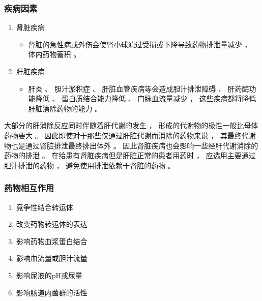 \documentclass[dvipsnames, svgnames, x11names]{beamer}
\begin{document}
\begin{frame}
    \frametitle{疾病因素}
    \begin{enumerate}
      \item 肾脏疾病
        \begin{itemize}
          \item 肾脏的急性病或外伤会使肾小球滤过受损或下降导致药物排泄量减少 ， 体内药物蓄积 。
        \end{itemize}
      \item 肝脏疾病
        \begin{itemize}
          \item 肝炎 、 胆汁淤积症 、 肝脏血管疾病等会造成胆汁排泄障碍 、 肝药酶功能降低 、 蛋白质结合能力降低 、 门脉血流量减少 ， 这些疾病都将降低肝脏清除药物的能力 。
        \end{itemize}
    \end{enumerate}
    \begin{blankblock}{}
        大部分的肝消除反应同时伴随着肝代谢的发生 ， 形成的代谢物的极性一般比母体药物要大 。 因此即使对于那些仅通过肝脏代谢而消除的药物来说 ， 其最终代谢物也是通过肾脏排泄最终排出体外 。 因此肾脏疾病也会影响一些经肝代谢消除的药物的排泄 。 在给患有肾脏疾病但是肝脏正常的患者用药时 ， 应选用主要通过胆汁排泄的药物 ， 避免使用排泄依赖于肾脏的药物 。
    \end{blankblock}
\end{frame}


\begin{frame}
    \frametitle{药物相互作用}
    \begin{enumerate}
      \item 竞争性结合转运体
      \item 改变药物转运体的表达
      \item 影响药物血浆蛋白结合
      \item 影响血流量或胆汁流量
      \item 影响尿液的pH或尿量
      \item 影响肠道内菌群的活性
    \end{enumerate}
\end{frame}
\end{document}
